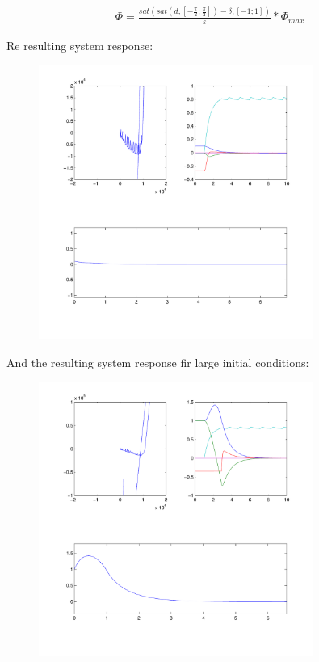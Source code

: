 \begin{align}
	\Phi = \frac{sat(sat(d,[-\frac{\pi}{2}; \frac{\pi}{2}]) - \delta, [-1; 1])}{\varepsilon} * \Phi_{max}
\end{align}

Re resulting system response:

\begin{figure}[H]
	\centering
	\includegraphics[width=0.8\textwidth]{img2/Ord01}
	\caption{}
	\label{}
\end{figure}

And the resulting system response fir large initial conditions:

\begin{figure}[H]
	\centering
	\includegraphics[width=0.8\textwidth]{img2/Ord11}
	\caption{}
	\label{}
\end{figure}

